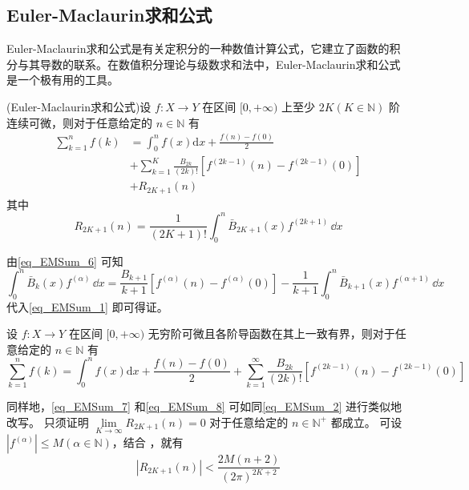 \subsection{Euler-Maclaurin求和公式}

Euler-Maclaurin求和公式是有关定积分的一种数值计算公式，它建立了函数的积分与其导数的联系。在数值积分理论与级数求和法中，Euler-Maclaurin求和公式是一个极有用的工具。

\begin{theorem}{}
(Euler-Maclaurin求和公式)设 $f:X\to Y$ 在区间 $[0,+\infty)$ 上至少 $2K(K\in{\mathbb N})$ 阶连续可微，则对于任意给定的 $n\in\mathbb N$ 有
\begin{equation}\label{eq_EMSum_7}
\begin{aligned}
    \sum_{k=1}^{n}f(k)&=\int_{0}^{n}f(x)\mathrm{d}x+\frac{f(n)-f(0)}{2}\\
    &+\sum_{k=1}^{K}\frac{B_{2k}}{(2k)!}[f^{(2k-1)}(n)-f^{(2k-1)}(0)]\\
    &+R_{2K+1}(n)
\end{aligned}
\end{equation}
其中
\begin{equation}
    R_{2K+1}(n)=\frac{1}{(2K+1)!}\int_{0}^{n}\bar{B}_{2K+1}(x)f^{(2k+1)}\,\dd x
\end{equation}
\end{theorem}
由\autoref{eq_EMSum_6} 可知
\begin{equation}
    \int_{0}^{n}\bar{B}_{k}(x)f^{(\alpha)}\,\dd x
    =\frac{B_{k+1}}{k+1}[f^{(\alpha)}(n)-f^{(\alpha)}(0)]
    -\frac{1}{k+1}\int_{0}^{n}\bar{B}_{k+1}(x)f^{(\alpha+1)}\,\dd x
\end{equation}
 代入\autoref{eq_EMSum_1} 即可得证。
\begin{theorem}{}
设 $f:X\to Y$ 在区间 $[0,+\infty)$ 无穷阶可微且各阶导函数在其上一致有界，则对于任意给定的 $n\in\mathbb N$ 有
\begin{equation}\label{eq_EMSum_8}
    \sum_{k=1}^{n}f(k)=\int_{0}^{n}f(x)\mathrm{d}x+\frac{f(n)-f(0)}{2}
    +\sum_{k=1}^{\infty}\frac{B_{2k}}{(2k)!}[f^{(2k-1)}(n)-f^{(2k-1)}(0)]
\end{equation}
\end{theorem}
同样地，\autoref{eq_EMSum_7} 和\autoref{eq_EMSum_8} 可如同\autoref{eq_EMSum_2} 进行类似地改写。
只须证明 $\lim\limits_{K\to\infty}R_{2K+1}(n)=0$ 对于任意给定的 $n\in{\mathbb N^{+}}$ 都成立。
可设 $|f^{(\alpha)}|\leqslant M(\alpha\in{\mathbb N})$，结合 ，就有
\begin{equation}
        |R_{2K+1}(n)|<\frac{2M(n+2)}{(2\pi)^{2K+2}}
\end{equation}
